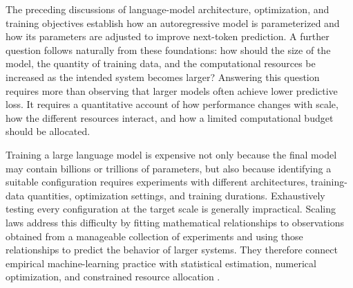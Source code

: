 %
%
%

The preceding discussions of language-model architecture, optimization, and
training objectives establish how an autoregressive model is parameterized and
how its parameters are adjusted to improve next-token prediction. A further
question follows naturally from these foundations: how should the size of the
model, the quantity of training data, and the computational resources be
increased as the intended system becomes larger? Answering this question
requires more than observing that larger models often achieve lower predictive
loss. It requires a quantitative account of how performance changes with scale,
how the different resources interact, and how a limited computational budget
should be allocated.

Training a large language model is expensive not only because the final model
may contain billions or trillions of parameters, but also because identifying
a suitable configuration requires experiments with different architectures,
training-data quantities, optimization settings, and training durations.
Exhaustively testing every configuration at the target scale is generally
impractical. Scaling laws address this difficulty by fitting mathematical
relationships to observations obtained from a manageable collection of
experiments and using those relationships to predict the behavior of larger
systems. They therefore connect empirical machine-learning practice with
statistical estimation, numerical optimization, and constrained resource
allocation \parencite{Sengupta2025ScalingSurvey,Li2025MisFitting}.

